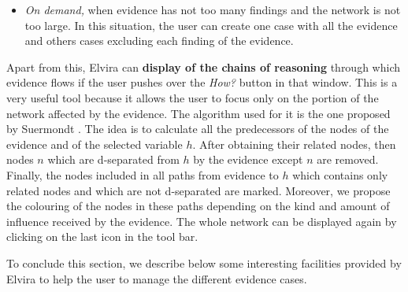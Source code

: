\begin{description}
\begin{description}
\begin{itemize}
  \item \emph{On demand,} when evidence has not too many findings
  and the network is not too large. In this situation, the user
  can create one case with all the evidence and others cases excluding
  each finding of the evidence.
  \end{itemize}

  Apart from this, Elvira can \textbf{display of the chains of reasoning}
  through which evidence flows if the user pushes over the \emph{How?} button in that window.
  This is a very useful tool because it allows the user to focus only on the portion of the network
  affected by the evidence. The algorithm used for it is the one proposed
  by Suermondt \cite{Suermondt92}. The idea is to calculate all the predecessors of the nodes of the evidence and of the selected
  variable $h$. After obtaining their related nodes, then nodes $n$ which are d-separated from $h$ by
  the evidence except $n$ are removed. Finally, the nodes included in all paths from evidence to $h$ which contains only related nodes and which are not
  d-separated are marked. Moreover, we propose the colouring of
  the nodes in these paths depending on the kind and amount of influence
  received by the evidence. The whole network can be displayed again by clicking on the last icon in the tool bar.
\end{description}
\end{description}

To conclude this section, we describe below some interesting
facilities provided by Elvira to help the user to manage the
different evidence cases.

